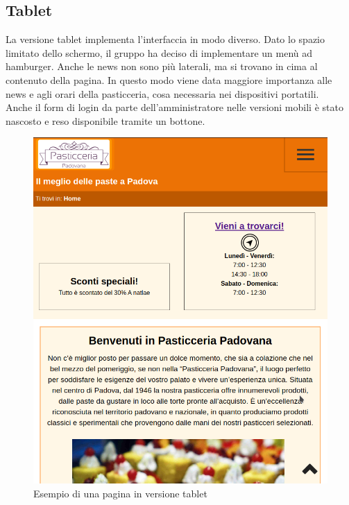 \subsection{Tablet}
La versione tablet implementa l'interfaccia in modo diverso. Dato lo spazio limitato dello schermo, il gruppo ha deciso di implementare
un menù ad hamburger. Anche le news non sono più laterali, ma si trovano in cima al contenuto della pagina. In questo modo viene data
maggiore importanza alle news e agli orari della pasticceria, cosa necessaria nei dispositivi portatili.\\
Anche il form di login da parte dell'amministratore nelle versioni mobili è stato nascosto e reso disponibile tramite un bottone.
\begin{figure}[!h]		
    \centering		  
	\includegraphics[width=0.8\linewidth]{sezioni/Progettazione/Immagini/tablet_example.png}
	\caption{Esempio di una pagina in versione tablet}
	\label{Fig:verTablet}
\end{figure}	    
\newpage

